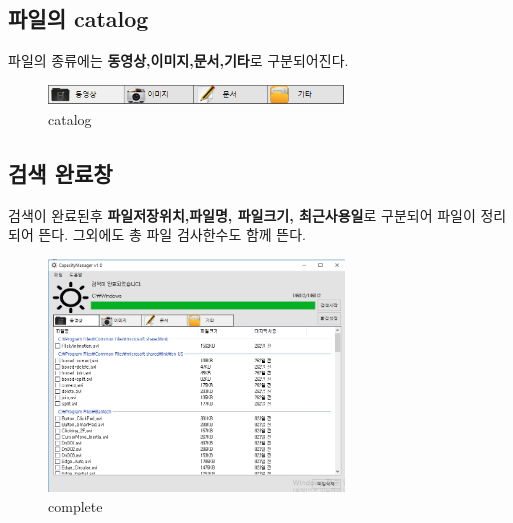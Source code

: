 \documentclass[a4paper, 13pt]{article} %
\begin{document}
		\subsection{파일의 catalog}
		파일의 종류에는 \textbf{동영상,이미지,문서,기타}로 구분되어진다.
	\begin{figure}[h]
		\centering
		\includegraphics[width=0.7\textwidth]{Figures/catalog}
		\caption{catalog }
		\label{fig:catalog}
	\end{figure}

		\subsection{검색 완료창}
		검색이 완료된후 \textbf{파일저장위치,파일명, 파일크기, 최근사용일}로 구분되어 파일이 정리되어 뜬다.
		그외에도 총 파일 검사한수도 함께 뜬다.
	\begin{figure}[h]
		\centering
		\includegraphics[width=0.7\textwidth]{Figures/complete}
		\caption{complete}
		\label{fig:complete}
	\end{figure}
\end{document}
